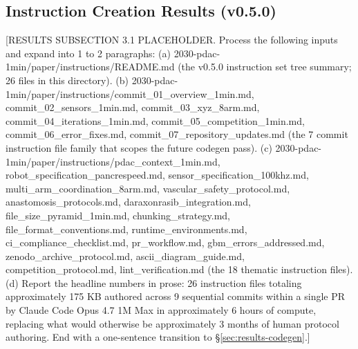 %

\subsection{Instruction Creation Results (v0.5.0)}
\label{sec:results-instructions}

[RESULTS SUBSECTION 3.1 PLACEHOLDER. Process the following inputs and expand into 1 to 2 paragraphs:
(a) 2030-pdac-1min/paper/instructions/README.md (the v0.5.0 instruction set tree summary; 26 files in this directory).
(b) 2030-pdac-1min/paper/instructions/{commit_01_overview_1min.md, commit_02_sensors_1min.md, commit_03_xyz_8arm.md, commit_04_iterations_1min.md, commit_05_competition_1min.md, commit_06_error_fixes.md, commit_07_repository_updates.md} (the 7 commit instruction file family that scopes the future codegen pass).
(c) 2030-pdac-1min/paper/instructions/{pdac_context_1min.md, robot_specification_pancrespeed.md, sensor_specification_100khz.md, multi_arm_coordination_8arm.md, vascular_safety_protocol.md, anastomosis_protocols.md, daraxonrasib_integration.md, file_size_pyramid_1min.md, chunking_strategy.md, file_format_conventions.md, runtime_environments.md, ci_compliance_checklist.md, pr_workflow.md, gbm_errors_addressed.md, zenodo_archive_protocol.md, ascii_diagram_guide.md, competition_protocol.md, lint_verification.md} (the 18 thematic instruction files).
(d) Report the headline numbers in prose: 26 instruction files totaling approximately 175 KB authored across 9 sequential commits within a single PR by Claude Code Opus 4.7 1M Max in approximately 6 hours of compute, replacing what would otherwise be approximately 3 months of human protocol authoring.
End with a one-sentence transition to \S \ref{sec:results-codegen}.]

